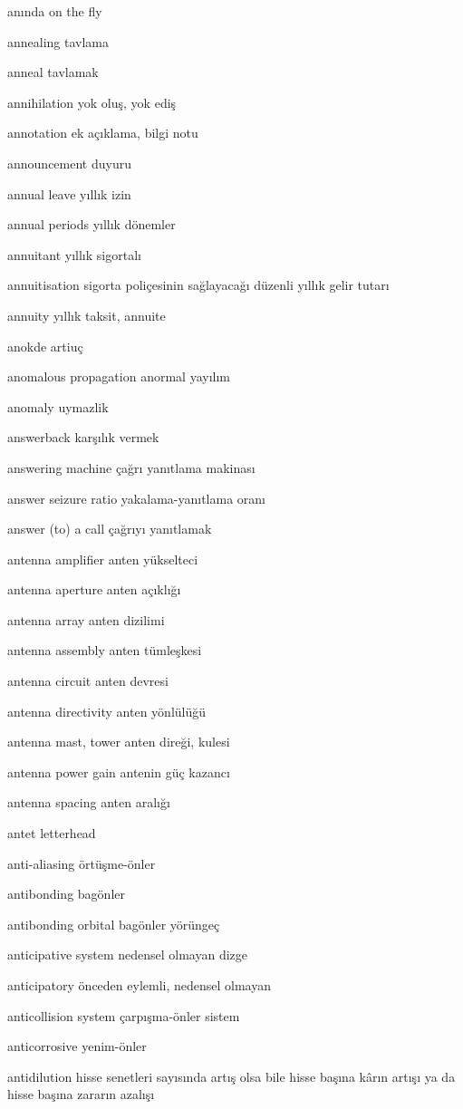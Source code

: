 \documentclass[12pt,fleqn]{article}\usepackage{../../common}
\begin{document}
anında on the fly

annealing tavlama

anneal tavlamak

annihilation yok oluş, yok ediş

annotation ek açıklama, bilgi notu

announcement duyuru

annual leave yıllık izin

annual periods yıllık dönemler

annuitant yıllık sigortalı

annuitisation sigorta poliçesinin sağlayacağı düzenli yıllık gelir tutarı

annuity yıllık taksit, annuite

anokde artiuç

anomalous propagation anormal yayılım

anomaly uymazlik

answerback karşılık vermek

answering machine çağrı yanıtlama makinası

answer seizure ratio yakalama-yanıtlama oranı

answer (to) a call çağrıyı yanıtlamak

antenna amplifier anten yükselteci

antenna aperture anten açıklığı

antenna array anten dizilimi

antenna assembly anten tümleşkesi

antenna circuit anten devresi

antenna directivity anten yönlülüğü

antenna mast, tower anten direği, kulesi

antenna power gain antenin güç kazancı

antenna spacing anten aralığı

antet letterhead

anti-aliasing örtüşme-önler

antibonding bagönler

antibonding orbital bagönler yörüngeç

anticipative system nedensel olmayan dizge

anticipatory önceden eylemli, nedensel olmayan

anticollision system çarpışma-önler sistem

anticorrosive yenim-önler

antidilution hisse senetleri sayısında artış olsa bile hisse başına kârın artışı ya da hisse başına zararın azalışı
\end{document}
